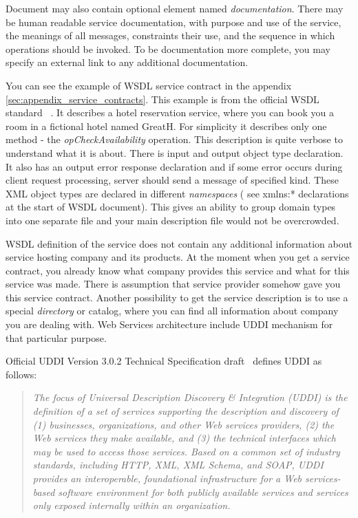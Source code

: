 

Document may also contain optional element named \textit{documentation}.
There may be human readable service documentation, with   purpose and use of the service, the meanings of all messages, constraints their use, and the sequence in which operations should be invoked.
To be documentation more complete, you may specify an external link to any additional documentation.


You can see the example of WSDL service contract in the appendix 
\autoref{sec:appendix_service_contracts}. This example is from the official
\gls{WSDL} standard ~\cite{wsdl_language_spec}. It describes a hotel reservation
service, where you can book you a room in a fictional hotel named GreatH. For simplicity it describes
only one method - the \textit{opCheckAvailability} operation. This description
is quite verbose to understand what it is about. There is input and output
object type declaration. It also has an output error response declaration and
if some error occurs during client request processing, server should send a
message of specified kind.
These \gls{XML} object types are declared in different \textit{namespaces} ( see
xmlns:*	declarations at the start of \gls{WSDL} document). This gives an ability
to group domain types into one separate file and your main description
file would not be overcrowded.


\gls{WSDL} definition of the service does not contain any additional
information about service hosting company and its products. At the moment when
you get a service contract, you already know what company provides this service and what
for this service was made. There is assumption that service provider somehow
gave you this service contract. Another possibility to get the service
description is to use a special \textit{directory} or catalog, where you can
find all information about company you are dealing with. Web Services
architecture include \gls{UDDI} mechanism for that particular purpose.

Official \gls{UDDI} Version 3.0.2 Technical Specification draft~\cite{uddi_spec}
defines \gls{UDDI} as follows:
\begin{quotation}
\textit{
 The focus of Universal Description Discovery & Integration (UDDI) is the
definition of a set of services supporting the description and discovery of (1) businesses,
organizations, and other Web services providers, 
(2) the Web services they make available,
 and (3) the technical interfaces which may be used to access those services.
 Based on a common set of industry standards, including HTTP, XML, XML Schema, and SOAP,
 UDDI provides an interoperable, foundational infrastructure for a Web services-based software environment
 for both publicly available services and services only exposed internally within an organization.
}
\end{quotation}

